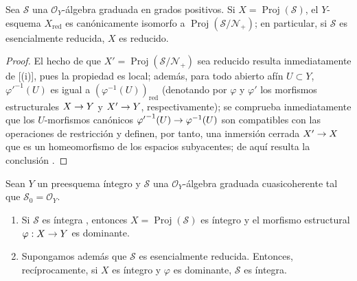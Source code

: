 \documentclass[oneside,10pt]{amsart}
\makeatletter
\newcommand{\ega@arrow}[2]{\mathchoice{#1}{#2}{#2}{#2}}
\renewcommand{\to}{\ega@arrow{\longrightarrow}{\rightarrow}}
\let\EGAOriginalLabel\label
\renewcommand{\label}[1]{\phantomsection\EGAOriginalLabel{#1}}
\makeatother
\begin{document}
\begin{proposition}[3.1.13]
\label{II.3.1.13-fr}
Sea $\mathcal{S}$ una $\mathcal{O}_Y$-álgebra graduada en grados positivos.
Si $X=\operatorname{Proj}(\mathcal{S})$, el $Y$-esquema $X_{\mathrm{red}}$ es canónicamente isomorfo a $\operatorname{Proj}(\mathcal{S}/\mathcal{N}_+)$; en particular, si $\mathcal{S}$ es esencialmente reducida, $X$ es reducido.
\end{proposition}

\begin{proof}
El hecho de que $X'=\operatorname{Proj}(\mathcal{S}/\mathcal{N}_+)$ sea reducido resulta inmediatamente de [(i)], pues la propiedad es local; además, para todo abierto afín $U\subset Y$, ${\varphi'}^{-1}(U)$ es igual a $(\varphi^{-1}(U))_{\mathrm{red}}$ (denotando por $\varphi$ y $\varphi'$ los morfismos estructurales $X\to Y$ y $X'\to Y$, respectivamente); se comprueba inmediatamente que los $U$-morfismos canónicos ${\varphi'}^{-1}(U)\to\varphi^{-1}(U)$ son compatibles con las operaciones de restricción y definen, por tanto, una inmersión cerrada $X'\to X$ que es un homeomorfismo de los espacios subyacentes; de aquí resulta la conclusión .
\end{proof}

\begin{proposition}[3.1.14]
\label{II.3.1.14-fr}
Sean $Y$ un preesquema íntegro y $\mathcal{S}$ una $\mathcal{O}_Y$-álgebra graduada cuasicoherente tal que $\mathcal{S}_0=\mathcal{O}_Y$.
\begin{enumerate}
  \item[(i)] Si $\mathcal{S}$ es íntegra , entonces $X=\operatorname{Proj}(\mathcal{S})$ es íntegro y el morfismo estructural $\varphi:X\to Y$ es dominante.
  \item[(ii)] Supongamos además que $\mathcal{S}$ es esencialmente reducida.
    Entonces, recíprocamente, si $X$ es íntegro y $\varphi$ es dominante, $\mathcal{S}$ es íntegra.
\end{enumerate}
\end{proposition}
\end{document}
